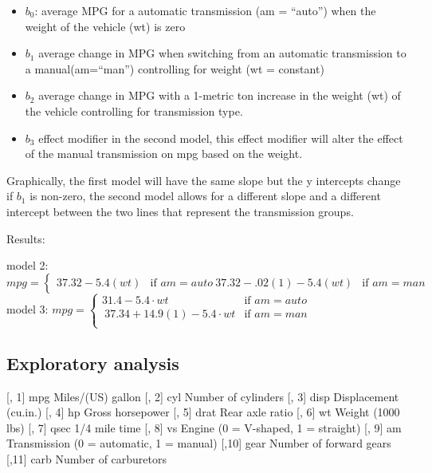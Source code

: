 \documentclass[
]{article}
\providecommand{\tightlist}{%
  \setlength{\itemsep}{0pt}\setlength{\parskip}{0pt}}
\begin{document}
\begin{itemize}
\tightlist
\item
  \(b_0\): average MPG for a automatic transmission (am = ``auto'') when
  the weight of the vehicle (wt) is zero\\
\item
  \(b_1\) average change in MPG when switching from an automatic
  transmission to a manual(am=``man'') controlling for weight (wt =
  constant)\\
\item
  \(b_2\) average change in MPG with a 1-metric ton increase in the
  weight (wt) of the vehicle controlling for transmission type.
\item
  \(b_3\) effect modifier in the second model, this effect modifier will
  alter the effect of the manual transmission on mpg based on the
  weight.
\end{itemize}

Graphically, the first model will have the same slope but the y
intercepts change if \(b_1\) is non-zero, the second model allows for a
different slope and a different intercept between the two lines that
represent the transmission groups.

Results:

model 2:
\(mpg =  \begin{cases}  37.32 -5.4(wt) & \text{if $am = auto$}  \ 37.32 - .02(1) -5.4(wt) & \text{if $am = man$}  \end{cases}\)
model 3:
\(mpg =  \begin{cases}  31.4 -5.4 \cdot wt & \text{if $am = auto$} \\  \ 37.34 + 14.9(1) -5.4\cdot wt & \text{if $am = man$} \\  \end{cases}\)

\hypertarget{exploratory-analysis}{%
\subsection{Exploratory analysis}\label{exploratory-analysis}}

{[}, 1{]} mpg Miles/(US) gallon {[}, 2{]} cyl Number of cylinders {[},
3{]} disp Displacement (cu.in.) {[}, 4{]} hp Gross horsepower {[}, 5{]}
drat Rear axle ratio {[}, 6{]} wt Weight (1000 lbs) {[}, 7{]} qsec 1/4
mile time {[}, 8{]} vs Engine (0 = V-shaped, 1 = straight) {[}, 9{]} am
Transmission (0 = automatic, 1 = manual) {[},10{]} gear Number of
forward gears {[},11{]} carb Number of carburetors
\end{document}
